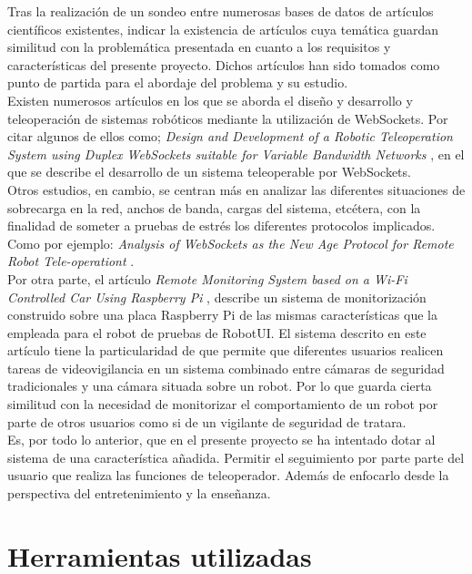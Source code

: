 \documentclass[a4paper,12pt]{article}
\begin{document}
Tras la realización de un sondeo entre numerosas bases de datos de artículos científicos existentes, indicar la existencia de artículos cuya temática guardan similitud con la problemática presentada
en cuanto a los requisitos y características del presente proyecto. Dichos artículos han sido tomados como punto de partida para el abordaje del problema y su estudio.\\

Existen numerosos artículos en los que se aborda el diseño y desarrollo y teleoperación de sistemas robóticos mediante la utilización de WebSockets. Por citar algunos de ellos como; \emph{Design and Development of a Robotic Teleoperation System using
Duplex WebSockets suitable for Variable Bandwidth Networks} \cite{article:1}, en el que se describe el desarrollo de un sistema teleoperable por WebSockets.\\
  
Otros estudios, en cambio, se centran más en analizar las diferentes situaciones de sobrecarga en la red, anchos de banda, cargas del sistema, etcétera, con la finalidad de someter a pruebas de estrés
los diferentes protocolos implicados. Como por ejemplo: \emph{Analysis of WebSockets as the New Age Protocol for Remote Robot Tele-operationt} \cite{article:2}.\\
  
Por otra parte, el artículo \emph{ Remote Monitoring System based on a Wi-Fi Controlled Car Using Raspberry Pi } \cite{article:3}, describe un sistema de monitorización construido sobre una placa 
Raspberry Pi de las mismas características que la empleada para el robot de pruebas de RobotUI. El sistema descrito en este artículo tiene la particularidad de que permite que diferentes usuarios realicen tareas de videovigilancia en un sistema combinado entre cámaras de seguridad tradicionales y una cámara situada sobre un robot.
Por lo que guarda cierta similitud con la necesidad de monitorizar el comportamiento de un robot por parte de otros usuarios como si de un vigilante de seguridad de tratara.\\ 
  
Es, por todo lo anterior, que en el presente proyecto se ha intentado dotar al sistema de una característica añadida. Permitir el seguimiento por parte parte del usuario que realiza las funciones de teleoperador. Además de enfocarlo
desde la perspectiva del entretenimiento y la enseñanza.\\


\section{Herramientas utilizadas}
\end{document}
